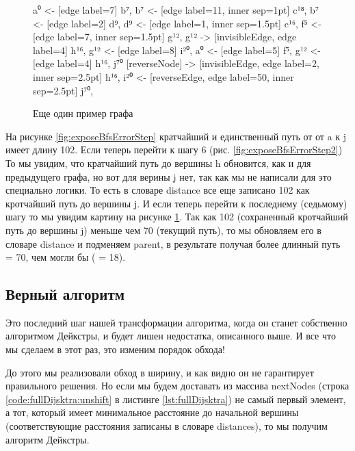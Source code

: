 \documentclass[../article.tex]{subfiles}
\begin{document}
\begin{figure*}
\begin{subfigure}{0.32\textwidth}
{            a⁰ <- [edge label=7] b⁷,
            b⁷ <- [edge label=11, inner sep=1pt] c¹⁸,
            b⁷ <- [edge label=2] d⁹,
            d⁹ <- [edge label=1, inner sep=1.5pt] c¹⁶,
            f⁵ <- [edge label=7, inner sep=1.5pt] g¹²,
            g¹² -> [invisibleEdge, edge label=4] h¹⁶,
            g¹² <- [edge label=8] i²⁰,
            a⁰ <- [edge label=5] f⁵,
            g¹² <- [edge label=4] h¹⁶,
            j⁷⁰ [reverseNode] -> [invisibleEdge, edge label=2, inner sep=2.5pt] h¹⁶,
            i²⁰ <- [reverseEdge, edge label=50, inner sep=2.5pt] j⁷⁰,
        }
        \caption{Еще один пример графа}
        \label{fig:exposeBfsErrorStep3}
    \end{subfigure}
\end{figure*}


На рисунке \ref{fig:exposeBfsErrorStep} кратчайший и единственный путь от от {\firacodebold a} к {\firacodebold j} имеет длину 102. Если теперь перейти к шагу 6 (рис. \ref{fig:exposeBfsErrorStep2}) То мы увидим, что кратчайший путь до вершины {\firacodebold h} обновится, как и для предыдущего графа, но вот для верины {\firacodebold j} нет, так как мы не написали для это специально логики. То есть в словаре distance все еще записано 102 как кротчайший путь до вершины {\firacodebold j}. И если теперь перейти к последнему (седьмому) шагу то мы увидим картину на рисунке \ref{fig:exposeBfsErrorStep3}. Так как 102 (сохраненный кротчайший путь до вершины j) меньше чем 70 (текущий путь), то мы обновляем его в словаре distance и подменяем {\firacodebold parent}, в результате получая более длинный путь {\firacodebold [j, i, g, f, a]} = 70, чем могли бы ({\firacodebold [j, h, ,g, f, a]} = 18).

\subsection{Верный алгоритм}

Это последний шаг нашей трансформации алгоритма, когда он станет собственно алгоритмом Дейкстры, и будет лишен недостатка, описанного выше. И все что мы сделаем в этот раз, это изменим порядок обхода!

До этого мы реализовали обход в ширину, и как видно он не гарантирует правильного решения. Но если мы будем доставать из массива {\firacodebold nextNodes} (строка \ref{code:fullDijsktra:unshift} в листинге \ref{lst:fullDijsktra}) не самый первый элемент, а тот, который имеет минимальное расстояние до начальной вершины (соответствующие расстояния записаны в словаре {\firacodebold distances}), то мы получим алгоритм Дейкстры.
\end{document}
